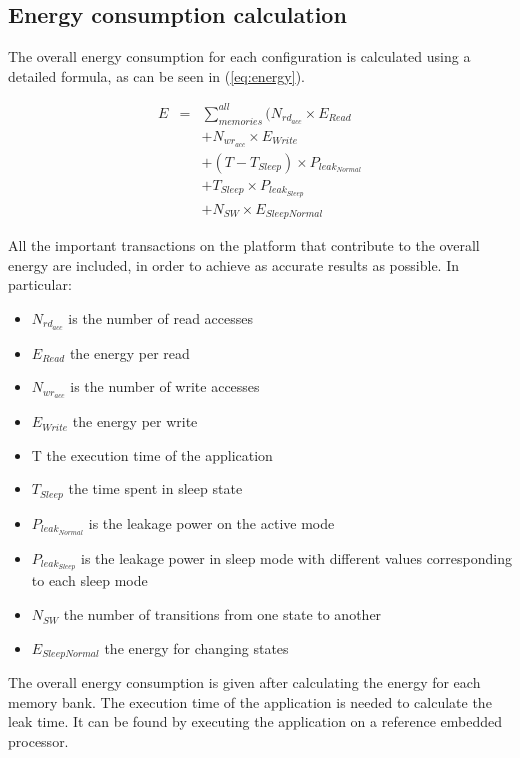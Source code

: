 \documentclass{acm_proc_article-sp}
\begin{document}
\subsection{Energy consumption calculation}

The overall energy consumption for each configuration is calculated using a detailed formula, as can be seen in (\ref{eq:energy}). 

\setlength{\arraycolsep}{0.0em}
\begin{eqnarray}
\label{eq:energy}
 E &{}= {}&\sum\limits_{memories}^{all}  ( N_{rd_{acc}} \times E_{Read} \nonumber\\
		&&+ N_{wr_{acc}} \times E_{Write} \nonumber\\
		&&+ (T - T_{Sleep}) \times P_{leak_{Normal}} \nonumber\\
		&&+ T_{Sleep} \times P_{leak_{Sleep}} \nonumber\\ 
		&& + N_{SW} \times E_{SleepNormal}
\end{eqnarray}
\setlength{\arraycolsep}{5pt}

All the important transactions on the platform that contribute to the overall energy are included, in order to achieve as accurate results as possible. In particular:
\begin{itemize}
\item $N_{rd_{acc}}$ is the number of read accesses
\item $E_{Read}$ the energy per read
\item $N_{wr_{acc}}$ is the number of write accesses 
\item $E_{Write}$ the energy per write 
\item T the execution time of the application
\item $T_{Sleep}$ the time spent in sleep state
\item $P_{leak_{Normal}}$ is the leakage power on the active mode 
\item $P_{leak_{Sleep}}$ is the leakage power in sleep mode with different values corresponding to each sleep mode 
\item $N_{SW}$ the number of transitions from one state to another
\item $E_{SleepNormal}$ the energy for changing states
\end{itemize}

 The overall energy consumption is given after calculating the energy for each memory bank. The execution time of the application is needed to calculate the leak time. It can be found by executing the application on a reference embedded processor.   
 
\end{document}

